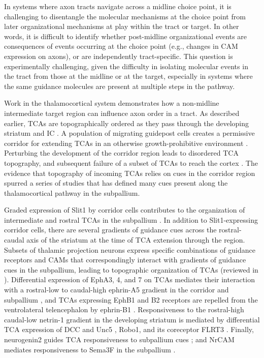 In systems where axon tracts navigate across a midline choice point, it is challenging to disentangle the molecular mechanisms at the choice point from later organizational mechanisms at play within the tract or target.
In other words, it is difficult to identify whether post-midline organizational events are consequences of events occurring at the choice point (e.g., changes in CAM expression on axons), or are independently tract-specific.
This question is experimentally challenging, given the difficulty in isolating molecular events in the tract from those at the midline or at the target, especially in systems where the same guidance molecules are present at multiple steps in the pathway. 

Work in the thalamocortical system demonstrates how a non-midline intermediate target region can influence axon order in a tract. 
As described earlier, TCAs are topographically ordered as they pass through the developing striatum and IC \cite{garel2014inputs}.
A population of migrating guidepost cells creates a permissive corridor for extending TCAs in an otherwise growth-prohibitive environment \cite{lopez2006tangential,bielle2011emergent}.
Perturbing the development of the corridor region leads to disordered TCA topography, and subsequent failure of a subset of TCAs to reach the cortex \cite{garel2002early}. 
The evidence that topography of incoming TCAs relies on cues in the corridor region spurred a series of studies that has defined many cues present along the thalamocortical pathway in the subpallium. 

Graded expression of Slit1 by corridor cells contributes to the organization of intermediate and rostral TCAs in the subpallium \cite{bielle2011emergent}. 
In addition to Slit1-expressing corridor cells, there are several gradients of guidance cues across the rostral-caudal axis of the striatum at the time of TCA extension through the region. 
Subsets of thalamic projection neurons express specific combinations of guidance receptors and CAMs that correspondingly interact with gradients of guidance cues in the subpallium, leading to topographic organization of TCAs (reviewed in ).
Differential expression of EphA3, 4, and 7 on TCAs mediates their interaction with a rostral-low to caudal-high ephrin-A5 gradient in the corridor and subpallium \cite{dufour2003area}, and TCAs expressing EphB1 and B2 receptors are repelled from the ventrolateral telencephalon by ephrin-B1 \cite{robichaux2014ephb}.
Responsiveness to the rostral-high caudal-low netrin-1 gradient in the developing striatum is mediated by differential TCA expression of DCC and Unc5 \cite{powell2008topography}, Robo1, and its coreceptor FLRT3 \cite{leyva2014flrt3}.
Finally, neurogenin2 guides TCA responsiveness to subpallium cues \cite{seibt2003neurogenin2}; and NrCAM mediates responsiveness to Sema3F in the subpallium \cite{demyanenko2011nrcam}. 

